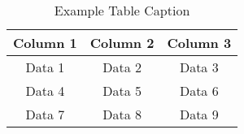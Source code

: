 \begin{table}[h]
    \centering
    \caption{Example Table Caption}
    \begin{tabular}{|c|c|c|}
        \hline
        Column 1 & Column 2 & Column 3 \\
        \hline
        Data 1   & Data 2   & Data 3   \\
        Data 4   & Data 5   & Data 6   \\
        Data 7   & Data 8   & Data 9   \\
        \hline
    \end{tabular}
    \label{tab:example}
\end{table}